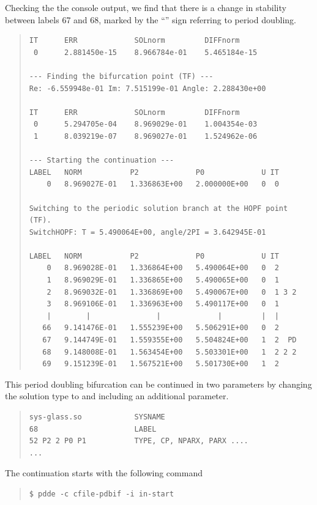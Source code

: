 \documentclass[10pt,a4paper]{ddedoc}
\begin{document}
Checking the the console output, we find that there is a change in
stability between labels 67 and 68, marked by the ``'' sign referring
to period doubling.
{ \small \begin{quote} \begin{lstlisting}[basicstyle=\tt,frame=single]
IT      ERR             SOLnorm         DIFFnorm
 0      2.881450e-15    8.966784e-01    5.465184e-15

--- Finding the bifurcation point (TF) ---
Re: -6.559948e-01 Im: 7.515199e-01 Angle: 2.288430e+00

IT      ERR             SOLnorm         DIFFnorm
 0      5.294705e-04    8.969029e-01    1.004354e-03
 1      8.039219e-07    8.969027e-01    1.524962e-06

--- Starting the continuation ---
LABEL   NORM           P2             P0             U IT
    0   8.969027E-01   1.336863E+00   2.000000E+00   0  0

Switching to the periodic solution branch at the HOPF point (TF).
SwitchHOPF: T = 5.490064E+00, angle/2PI = 3.642945E-01

LABEL   NORM           P2             P0             U IT
    0   8.969028E-01   1.336864E+00   5.490064E+00   0  2
    1   8.969029E-01   1.336865E+00   5.490065E+00   0  1
    2   8.969032E-01   1.336869E+00   5.490067E+00   0  1 3 2
    3   8.969106E-01   1.336963E+00   5.490117E+00   0  1
    |        |               |             |         |  |
   66   9.141476E-01   1.555239E+00   5.506291E+00   0  2
   67   9.144749E-01   1.559355E+00   5.504824E+00   1  2  PD
   68   9.148008E-01   1.563454E+00   5.503301E+00   1  2 2 2
   69   9.151239E-01   1.567521E+00   5.501730E+00   1  2
\end{lstlisting} \end{quote} } \noindent
This period doubling bifurcation can be continued in two parameters 
by changing the solution type to  and including an additional
parameter.
{ \small \begin{quote} \begin{lstlisting}[basicstyle=\tt,frame=single]
sys-glass.so            SYSNAME
68                      LABEL
52 P2 2 P0 P1           TYPE, CP, NPARX, PARX ....
...
\end{lstlisting} \end{quote} } \noindent
The continuation starts with the following command
{ \small \begin{quote} \begin{lstlisting}[basicstyle=\tt,frame=single]
$ pdde -c cfile-pdbif -i in-start
\end{lstlisting} \end{quote} } \noindent
\end{document}
